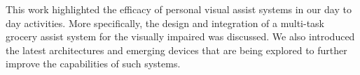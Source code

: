 This work highlighted the efficacy of personal visual assist systems in our day to day activities. 
More specifically, the design and integration of a multi-task grocery assist system for the visually impaired was 
discussed. We also introduced the latest architectures and emerging devices that are being explored to further improve the capabilities of such systems. 
